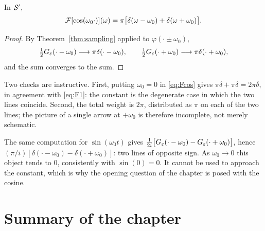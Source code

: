 \begin{proposition}\label{prop:cosine}
In $\mathcal{S}'$,
\begin{equation}
\mathcal{F}[\cos(\omega_{0}\cdot)](\omega)
=\pi\big[\delta(\omega-\omega_{0})+\delta(\omega+\omega_{0})\big].
\label{eq:Fcos}
\end{equation}
\end{proposition}

\begin{proof}
By Theorem~\ref{thm:sampling} applied to $\varphi(\cdot\pm\omega_{0})$,
\begin{equation}
\tfrac12 G_{\varepsilon}(\cdot-\omega_{0})\longrightarrow\pi\delta(\cdot-\omega_{0}),
\qquad
\tfrac12 G_{\varepsilon}(\cdot+\omega_{0})\longrightarrow\pi\delta(\cdot+\omega_{0}),
\end{equation}
and the sum converges to the sum.
\end{proof}

Two checks are instructive. First, putting $\omega_{0}=0$ in \eqref{eq:Fcos} gives
$\pi\delta+\pi\delta=2\pi\delta$, in agreement with \eqref{eq:F1}: the constant is the degenerate case
in which the two lines coincide. Second, the total weight is $2\pi$, distributed as $\pi$ on each of
the two lines; the picture of a single arrow at $+\omega_{0}$ is therefore incomplete, not merely
schematic.

\begin{remark}
The same computation for $\sin(\omega_{0}t)$ gives
$\tfrac{1}{2i}\big[G_{\varepsilon}(\cdot-\omega_{0})-G_{\varepsilon}(\cdot+\omega_{0})\big]$, hence
$(\pi/i)[\delta(\cdot-\omega_{0})-\delta(\cdot+\omega_{0})]$: two lines of opposite sign. As
$\omega_{0}\to0$ this object tends to $0$, consistently with $\sin(0)=0$. It cannot be used to
approach the constant, which is why the opening question of the chapter is posed with the cosine.
\end{remark}

\section{Summary of the chapter}

